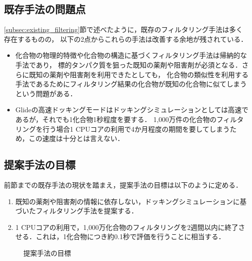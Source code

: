 \subsection{既存手法の問題点}
\ref{subsec:existing_filtering}節で述べたように，既存のフィルタリング手法は多く存在するものの，
以下の2点からこれらの手法は改善する余地が残されている．
\begin{itemize}
\item 化合物の物理的特徴や化合物の構造に基づくフィルタリング手法は帰納的な手法であり，
	標的タンパク質を狙った既知の薬剤や阻害剤が必須となる．さらに既知の薬剤や阻害剤を利用できたとしても，
	化合物の類似性を利用する手法であるためにフィルタリング結果の化合物が既知の化合物に似てしまうという問題がある．	
\item Glideの高速ドッキングモードはドッキングシミュレーションとしては高速であるが，それでも1化合物1秒程度を要する．
	1,000万件の化合物のフィルタリングを行う場合1 CPUコアの利用で4か月程度の期間を要してしまうため，この速度は十分とは言えない．
\end{itemize}

\subsection{提案手法の目標}
前節までの既存手法の現状を踏まえ，提案手法の目標は以下のように定める．
\begin{enumerate}
\item 既知の薬剤や阻害剤の情報に依存しない，ドッキングシミュレーションに基づいたフィルタリング手法を提案する．
\item 1 CPUコアの利用で，1,000万化合物のフィルタリングを2週間以内に終了させる．これは，1化合物につき約0.1秒で評価を行うことに相当する．
\end{enumerate}

\begin{figure}[tb]
 \begin{center}
  \caption{提案手法の目標}
  \label{fig:proposal_aim}
 \end{center}
\end{figure}
